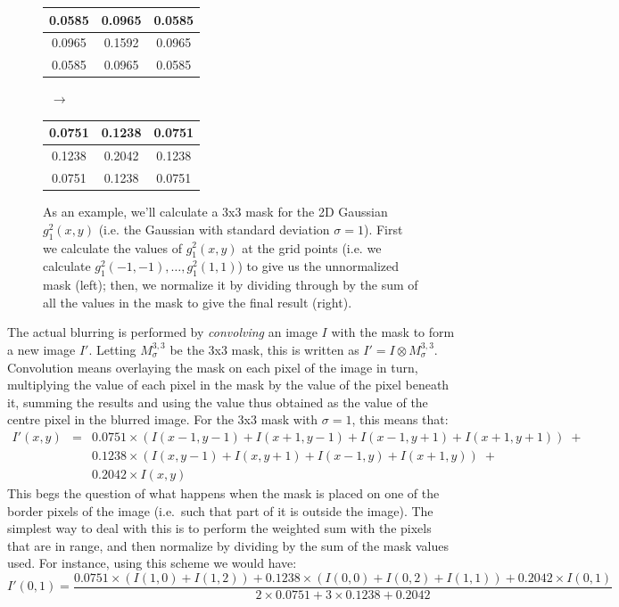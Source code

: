 \begin{figure}[p]
\begin{center}
\begin{tabular}{|c|c|c|}
\hline
0.0585 & 0.0965 & 0.0585 \\
\hline
0.0965 & 0.1592 & 0.0965 \\
\hline
0.0585 & 0.0965 & 0.0585 \\
\hline
\end{tabular}%
$\;\; \longrightarrow \;\;$%
\begin{tabular}{|c|c|c|}
\hline
0.0751 & 0.1238 & 0.0751 \\
\hline
0.1238 & 0.2042 & 0.1238 \\
\hline
0.0751 & 0.1238 & 0.0751 \\
\hline
\end{tabular}
\end{center}
\caption{As an example, we'll calculate a 3x3 mask for the 2D Gaussian $g_1^2(x,y)$ (i.e. the Gaussian with standard deviation $\sigma = 1$). First we calculate the values of $g_1^2(x,y)$ at the grid points (i.e. we calculate $g_1^2(-1,-1), \ldots, g_1^2(1,1)$) to give us the unnormalized mask (left); then, we normalize it by dividing through by the sum of all the values in the mask to give the final result (right).}
\label{fig:segmentation-watershed-gaussianmask}
\end{figure}

The actual blurring is performed by \emph{convolving} an image $I$ with the mask to form a new image $I'$. Letting $M_\sigma^{3,3}$ be the 3x3 mask, this is written as $I' = I \otimes M_\sigma^{3,3}$. Convolution means overlaying the mask on each pixel of the image in turn, multiplying the value of each pixel in the mask by the value of the pixel beneath it, summing the results and using the value thus obtained as the value of the centre pixel in the blurred image. For the 3x3 mask with $\sigma = 1$, this means that:
%
\begin{eqnarray*}
I'(x,y)
& = & 0.0751 \times (I(x-1,y-1) + I(x+1,y-1) + I(x-1,y+1) + I(x+1,y+1)) \; + \\
&   & 0.1238 \times (I(x,y-1) + I(x,y+1) + I(x-1,y) + I(x+1,y)) \; + \\
&   & 0.2042 \times I(x,y)
\end{eqnarray*}
%
This begs the question of what happens when the mask is placed on one of the border pixels of the image (i.e.~such that part of it is outside the image). The simplest way to deal with this is to perform the weighted sum with the pixels that are in range, and then normalize by dividing by the sum of the mask values used. For instance, using this scheme we would have:
%
\[
I'(0,1) = \frac{0.0751 \times (I(1,0) + I(1,2)) + 0.1238 \times (I(0,0) + I(0,2) + I(1,1)) + 0.2042 \times I(0,1)}{2 \times 0.0751 + 3 \times 0.1238 + 0.2042}
\]

